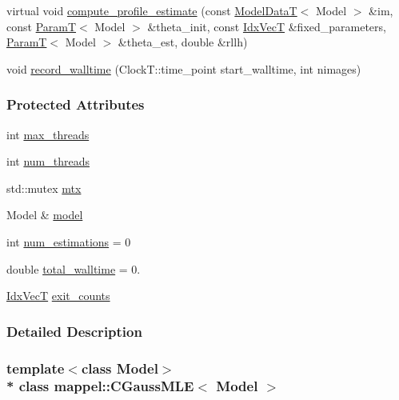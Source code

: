 \begin{DoxyCompactItemize}
virtual void \hyperlink{classmappel_1_1Estimator_a273f65624e06688cd4b1126e3e7556ae}{compute\+\_\+profile\+\_\+estimate} (const \hyperlink{namespacemappel_a97f050df953605381ae9c901c3b125f1}{Model\+DataT}$<$ Model $>$ \&im, const \hyperlink{namespacemappel_a667925cb0d6c0e49f2f035cc5a9a6857}{ParamT}$<$ Model $>$ \&theta\+\_\+init, const \hyperlink{namespacemappel_ac63743dcd42180127307cd0e4ecdd784}{Idx\+VecT} \&fixed\+\_\+parameters, \hyperlink{namespacemappel_a667925cb0d6c0e49f2f035cc5a9a6857}{ParamT}$<$ Model $>$ \&theta\+\_\+est, double \&rllh)
\item 
void \hyperlink{classmappel_1_1Estimator_a50125572d3b87ebcf1ffb27a8d8c643d}{record\+\_\+walltime} (Clock\+T\+::time\+\_\+point start\+\_\+walltime, int nimages)
\end{DoxyCompactItemize}
\subsubsection*{Protected Attributes}
\begin{DoxyCompactItemize}
\item 
int \hyperlink{classmappel_1_1ThreadedEstimator_a31391f8aaab3484f58bfdedbdb22be42}{max\+\_\+threads}
\item 
int \hyperlink{classmappel_1_1ThreadedEstimator_a6afa05d7d971f3317ce1602de853123b}{num\+\_\+threads}
\item 
std\+::mutex \hyperlink{classmappel_1_1ThreadedEstimator_a4538fd0860243430bfd47e8064c8cfe4}{mtx}
\item 
Model \& \hyperlink{classmappel_1_1Estimator_a8322546d87ccdf01f8b0dcd9dae509f0}{model}
\item 
int \hyperlink{classmappel_1_1Estimator_ab15b88435d6c50a68fac84465d950b12}{num\+\_\+estimations} = 0
\item 
double \hyperlink{classmappel_1_1Estimator_a5a408458a111c5222193871fa6bb6644}{total\+\_\+walltime} = 0.
\item 
\hyperlink{namespacemappel_ac63743dcd42180127307cd0e4ecdd784}{Idx\+VecT} \hyperlink{classmappel_1_1Estimator_a490b648fdbd7ddae7ce41fbf26e29b48}{exit\+\_\+counts}
\end{DoxyCompactItemize}


\subsubsection{Detailed Description}
\subsubsection*{template$<$class Model$>$\\*
class mappel\+::\+C\+Gauss\+M\+L\+E$<$ Model $>$}



